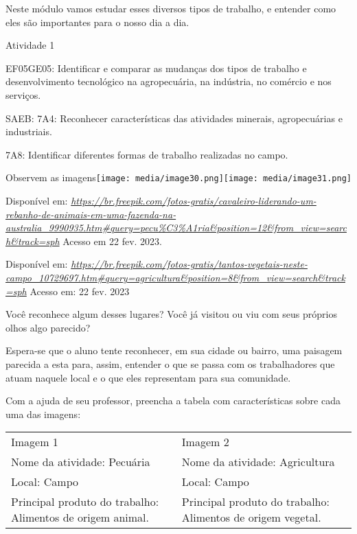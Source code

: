Neste módulo vamos estudar esses diversos tipos de trabalho, e entender
como eles são importantes para o nosso dia a dia.

Atividade 1

EF05GE05: Identificar e comparar as mudanças dos tipos de trabalho e
desenvolvimento tecnológico na agropecuária, na indústria, no comércio e
nos serviços.

SAEB: 7A4: Reconhecer características das atividades minerais,
agropecuárias e industriais.

7A8: Identificar diferentes formas de trabalho realizadas no campo.

Observem as
imagens\texttt{[image: media/image30.png]}\texttt{[image: media/image31.png]}

Disponível em:
\href{https://br.freepik.com/fotos-gratis/cavaleiro-liderando-um-rebanho-de-animais-em-uma-fazenda-na-australia_9990935.htm\#query=pecu\%C3\%A1ria\&position=12\&from_view=search\&track=sph}{\emph{https://br.freepik.com/fotos-gratis/cavaleiro-liderando-um-rebanho-de-animais-em-uma-fazenda-na-australia\_9990935.htm\#query=pecu\%C3\%A1ria\&position=12\&from\_view=search\&track=sph}}
Acesso em 22 fev. 2023.

Disponível em:
\href{https://br.freepik.com/fotos-gratis/tantos-vegetais-neste-campo_10729697.htm\#query=agricultura\&position=8\&from_view=search\&track=sph}{\emph{https://br.freepik.com/fotos-gratis/tantos-vegetais-neste-campo\_10729697.htm\#query=agricultura\&position=8\&from\_view=search\&track=sph}}
Acesso em: 22 fev. 2023

Você reconhece algum desses lugares? Você já visitou ou viu com seus
próprios olhos algo parecido?

Espera-se que o aluno tente reconhecer, em sua cidade ou bairro, uma
paisagem parecida a esta para, assim, entender o que se passa com os
trabalhadores que atuam naquele local e o que eles representam para sua
comunidade.

Com a ajuda de seu professor, preencha a tabela com características
sobre cada uma das imagens:

\begin{longtable}[]{@{}ll@{}}
\toprule
Imagem 1 & Imagem 2\tabularnewline
Nome da atividade: Pecuária & Nome da atividade:
Agricultura\tabularnewline
Local: Campo & Local: Campo\tabularnewline
Principal produto do trabalho: Alimentos de origem animal. & Principal
produto do trabalho: Alimentos de origem vegetal.\tabularnewline
\bottomrule
\end{longtable}

